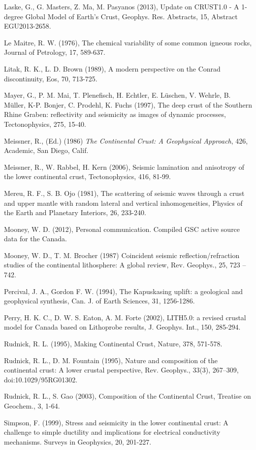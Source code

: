 \documentclass[review]{elsarticle}
\begin{document}
Laske, G., G. Masters, Z. Ma, M. Pasyanos (2013), Update on CRUST1.0 - A 1-degree Global Model of Earth's Crust, Geophys. Res. Abstracts, 15, Abstract EGU2013-2658.

Le Maitre, R. W. (1976), The chemical variability of some common igneous rocks, Journal of Petrology, 17, 589-637.

Litak, R. K., L. D. Brown (1989), A modern perspective on the Conrad discontinuity, Eos, 70, 713-725.

Mayer, G., P. M. Mai, T. Plenefisch, H. Echtler, E. Lüschen, V. Wehrle, B. Müller, K-P. Bonjer, C. Prodehl, K. Fuchs (1997), The deep crust of the Southern Rhine Graben: reflectivity and seismicity as images of dynamic processes, Tectonophysics, 275, 15-40.

Meissner, R., (Ed.) (1986) {\it The Continental Crust: A Geophysical Approach}, 426, Academic, San Diego, Calif.

Meissner, R., W. Rabbel, H. Kern (2006), Seismic lamination and anisotropy of the lower continental crust, Tectonophysics, 416, 81-99.

Mereu, R. F., S. B. Ojo (1981), The scattering of seismic waves through a crust and upper mantle with random lateral and vertical inhomogeneities, Physics of the Earth and Planetary Interiors, 26, 233-240.

Mooney, W. D. (2012), Personal communication. Compiled GSC active source data for the Canada.

Mooney, W. D., T. M. Brocher (1987) Coincident seismic reflection/refraction studies of the continental lithosphere: A global review, Rev. Geophys., 25, 723 – 742.

Percival, J. A., Gordon F. W. (1994), The Kapuskasing uplift: a geological and geophysical synthesis, Can. J. of Earth Sciences, 31, 1256-1286.

Perry, H. K. C., D. W. S. Eaton, A. M. Forte (2002), LITH5.0: a revised crustal model for Canada based on Lithoprobe results,  J. Geophys. Int., 150, 285-294.

Rudnick, R. L. (1995), Making Continental Crust, Nature, 378, 571-578.

Rudnick, R. L., D. M. Fountain (1995), Nature and composition of the continental crust: A lower crustal perspective, Rev. Geophys., 33(3), 267–309, doi:10.1029/95RG01302.

Rudnick, R. L., S. Gao (2003), Composition of the Continental Crust, Treatise on Geochem., 3, 1-64.

Simpson, F. (1999), Stress and seismicity in the lower continental crust: A challenge to simple ductility and implications for electrical conductivity mechanisms. Surveys in Geophysics, 20, 201-227.
\end{document}
